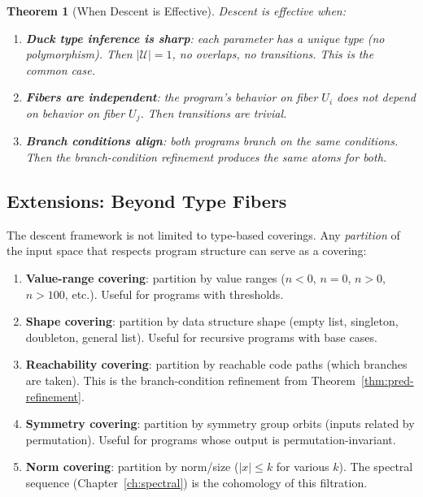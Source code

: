 \documentclass[11pt,a4paper]{report}
\theoremstyle{definition}
\theoremstyle{plain}
\newtheorem{theorem}[definition]{Theorem}
\newcommand{\covers}{\mathcal{U}}
\begin{document}
\begin{theorem}[When Descent is Effective]
\label{thm:effective-descent}
Descent is effective when:
\begin{enumerate}
  \item \textbf{Duck type inference is sharp}: each parameter has
    a unique type (no polymorphism).  Then $|\covers| = 1$, no
    overlaps, no transitions.  This is the common case.
  \item \textbf{Fibers are independent}: the program's behavior on
    fiber $U_i$ does not depend on behavior on fiber $U_j$.  Then
    transitions are trivial.
  \item \textbf{Branch conditions align}: both programs branch on
    the same conditions.  Then the branch-condition refinement
    produces the same atoms for both.
\end{enumerate}
\end{theorem}

\subsection{Extensions: Beyond Type Fibers}

The descent framework is not limited to type-based coverings.  Any
\emph{partition} of the input space that respects program structure
can serve as a covering:

\begin{enumerate}
  \item \textbf{Value-range covering}: partition by value ranges
    ($n < 0$, $n = 0$, $n > 0$, $n > 100$, etc.).  Useful for
    programs with thresholds.
  \item \textbf{Shape covering}: partition by data structure shape
    (empty list, singleton, doubleton, general list).  Useful for
    recursive programs with base cases.
  \item \textbf{Reachability covering}: partition by reachable
    code paths (which branches are taken).  This is the
    branch-condition refinement from Theorem~\ref{thm:pred-refinement}.
  \item \textbf{Symmetry covering}: partition by symmetry group
    orbits (inputs related by permutation).  Useful for programs
    whose output is permutation-invariant.
  \item \textbf{Norm covering}: partition by norm/size ($|x| \leq k$
    for various $k$).  The spectral sequence
    (Chapter~\ref{ch:spectral}) is the cohomology of this filtration.
\end{enumerate}
\end{document}
